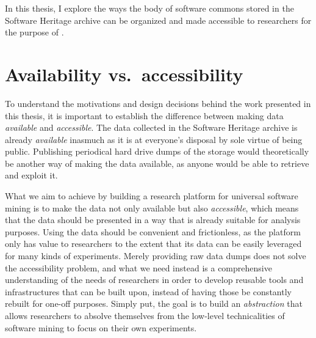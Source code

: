 In this thesis, I explore the ways the body of software commons stored in the
Software Heritage archive can be organized and made accessible to researchers
for the purpose of .

\section{Availability vs.\ accessibility}

To understand the motivations and design decisions behind the work presented in
this thesis, it is important to establish the difference between making data
\emph{available} and \emph{accessible}.  The data collected in the Software
Heritage archive is already \emph{available} inasmuch as it is at everyone's
disposal by sole virtue of being public. Publishing periodical hard drive dumps
of the storage would theoretically be another way of making the data available,
as anyone would be able to retrieve and exploit it.

What we aim to achieve by building a research platform for universal software
mining is to make the data not only available but also \emph{accessible}, which
means that the data should be presented in a way that is already suitable for
analysis purposes. Using the data should be convenient and frictionless,
as the platform only has value to researchers to the extent that its data can
be easily leveraged for many kinds of experiments. Merely providing raw data
dumps does not solve the accessibility problem, and what we need instead is a
comprehensive understanding of the needs of researchers in order to develop
reusable tools and infrastructures that can be built upon, instead of having
those be constantly rebuilt for one-off purposes. Simply put, the goal is to
build an \emph{abstraction} that allows researchers to absolve themselves from
the low-level technicalities of software mining to focus on their own
experiments.

